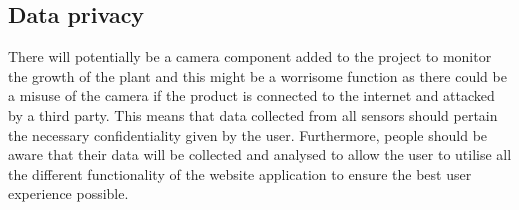 \documentclass{article}
\begin{document}
\subsection{Data privacy}
There will potentially be a camera component added to the project to monitor the growth of the plant and this might be a worrisome function as there could be a misuse of the camera if the product is connected to the internet and attacked by a third party. This means that data collected from all sensors should pertain the necessary confidentiality given by the user. Furthermore, people should be aware that their data will be collected and analysed to allow the user to utilise all the different functionality of the website application to ensure the best user experience possible.

    
    
    
    
\end{document}
